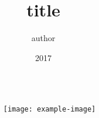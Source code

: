 \documentclass{beamer}
\title{title}
\institute{inse}
\author{author}
\date{2017}
\begin{document}
\begin{frame}[plain]
    \begin{columns}[c]
        \begin{column}{.7\textwidth}
            \titlepage
        \end{column}
        \begin{column}{.2\textwidth}
            \texttt{[image: example-image]}
        \end{column}
    \end{columns}
\end{frame}
\end{document}
